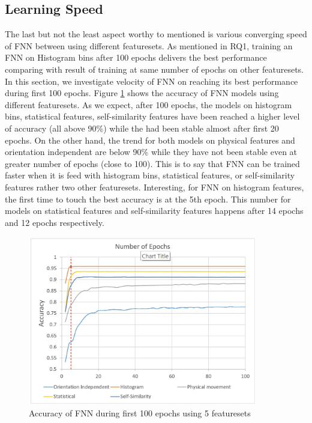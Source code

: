 \documentclass[journal,article,submit,moreauthors,pdftex]{Definitions/mdpi}
\begin{document}
\subsection{Learning Speed }
The last but not the least aspect worthy to mentioned is various converging speed of FNN between using different featuresets. As mentioned in RQ1, training an FNN on Histogram bins after 100 epochs delivers the best performance comparing with result of training at same number of epochs on other featuresets. In this section, we investigate velocity of FNN on reaching its best performance during first 100 epochs. Figure \ref{fig:fnn_learning_speed} shows the accuracy of FNN models using different featuresets. As we expect, after 100 epochs, the models on histogram bins, statistical features, self-similarity features have been reached a higher level of accuracy (all above 90\%) while the had been stable almost after first 20 epochs. On the other hand, the trend for both models on physical features and orientation independent are below 90\% while they have not been stable even at greater number of epochs (close to 100). This is to say that FNN can be trained faster when it is feed with histogram bins, statistical features, or self-similarity features rather two other featuresets. Interesting, for FNN on histogram features, the first time to touch the best accuracy is at the 5th epoch. This number for models on statistical features and self-similarity features happens after 14 epochs and 12 epochs respectively.

\begin{figure}[H]
	\centering
		\includegraphics[width= 10cm]{Definitions/images/fnn_learning_speed.jpg}
		\caption{Accuracy of FNN during first 100 epochs using 5 featuresets}
		\label{fig:fnn_learning_speed}
\end{figure} 
\end{document}
